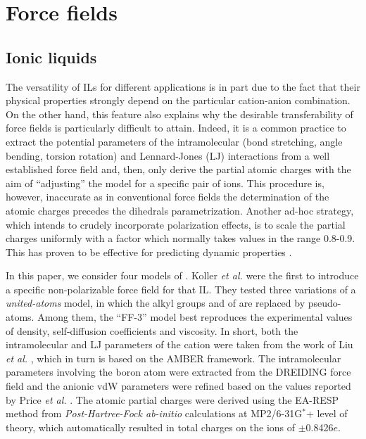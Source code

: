 \documentclass[3p,twocolumn]{elsarticle}
\begin{document}
\section{Force fields}
\label{sec:force_field}
\subsection{Ionic liquids}
\label{sec:force_field_il}

The versatility of ILs for different applications is in part due to the fact that their physical properties strongly depend on the particular cation-anion combination.
On the other hand, this feature also explains why the desirable transferability of force fields is particularly difficult to attain.
Indeed, it is a common practice to extract the potential parameters of the intramolecular (bond stretching, angle bending, torsion rotation) and Lennard-Jones (LJ) interactions from a well established force field and, then, only derive the partial atomic charges with the aim of ``adjusting'' the model for a specific pair of ions.
This procedure is, however, inaccurate as in conventional force fields the determination of the atomic charges precedes the dihedrals parametrization.
Another ad-hoc strategy, which intends to crudely incorporate polarization effects, is to scale the partial charges uniformly with a factor which normally takes values in the range 0.8-0.9.
This has proven to be effective for predicting dynamic properties \cite{Schr_der_2012}.

In this paper, we consider four models of \ce{[emim][B(CN)_4]}.
Koller \textit{et al.} \cite{Koller_2012} were the first to introduce a specific non-polarizable force field for that IL.
They tested three variations of a \textit{united-atoms} model, in which the alkyl groups  and  of \ce{[emim]^+} are replaced by pseudo-atoms.
Among them, the ``FF-3'' model best reproduces the experimental values of density, self-diffusion coefficients and viscosity.
In short, both the intramolecular and LJ parameters of the cation were taken from the work of Liu \textit{et al.} \cite{Liu_2006}, which in turn is based on the AMBER \cite{Cornell_1995} framework.
The intramolecular parameters involving the boron atom were extracted from the DREIDING \cite{Mayo_1990} force field and the anionic vdW parameters were refined based on the values reported by Price \textit{et al.} \cite{Price_2001}.
The atomic partial charges were derived using the EA-RESP method \cite{Basma_2001} from \textit{Post-Hartree-Fock ab-initio} calculations at MP2/6-31G$^\ast$+ level of theory, which automatically resulted in total charges on the ions of $\pm$0.8426$e$. 
\end{document}
